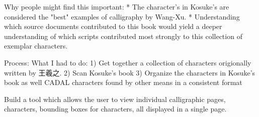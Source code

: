 Why people might find this important:
    *  The character's in Kosuke's are considered the "best" examples of calligraphy by Wang-Xu.
    *  Understanding which source documents contributed to this book would yield a deeper understanding of which scripts contributed most strongly to this collection of exemplar characters.

Process:  What I had to do:
    1)  Get together a collection of characters origionally written by 王羲之.
    2)  Scan Kosuke's book
    3)  Organize the characters in Kosuke's book as well CADAL characters found by other means in a consistent format
    
        Build a tool which allows the user to view individual calligraphic pages, characters, bounding boxes for characters, all displayed in a single page.
